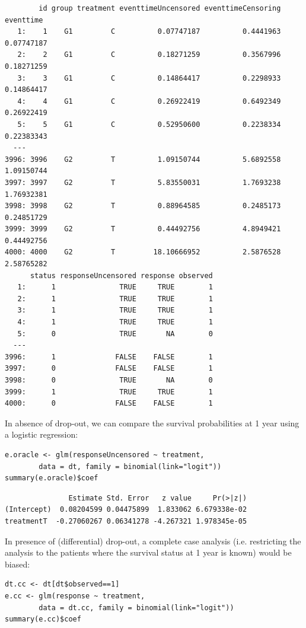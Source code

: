 \documentclass[12pt]{article}
\begin{document}
\begin{verbatim}
        id group treatment eventtimeUncensored eventtimeCensoring  eventtime
   1:    1    G1         C          0.07747187          0.4441963 0.07747187
   2:    2    G1         C          0.18271259          0.3567996 0.18271259
   3:    3    G1         C          0.14864417          0.2298933 0.14864417
   4:    4    G1         C          0.26922419          0.6492349 0.26922419
   5:    5    G1         C          0.52950600          0.2238334 0.22383343
  ---                                                                       
3996: 3996    G2         T          1.09150744          5.6892558 1.09150744
3997: 3997    G2         T          5.83550031          1.7693238 1.76932381
3998: 3998    G2         T          0.88964585          0.2485173 0.24851729
3999: 3999    G2         T          0.44492756          4.8949421 0.44492756
4000: 4000    G2         T         18.10666952          2.5876528 2.58765282
      status responseUncensored response observed
   1:      1               TRUE     TRUE        1
   2:      1               TRUE     TRUE        1
   3:      1               TRUE     TRUE        1
   4:      1               TRUE     TRUE        1
   5:      0               TRUE       NA        0
  ---                                            
3996:      1              FALSE    FALSE        1
3997:      0              FALSE    FALSE        1
3998:      0               TRUE       NA        0
3999:      1               TRUE     TRUE        1
4000:      0              FALSE    FALSE        1
\end{verbatim}

In absence of drop-out, we can compare the survival
probabilities at 1 year using a logistic regression:
\lstset{language=r,label= ,caption= ,captionpos=b,numbers=none}
\begin{lstlisting}
e.oracle <- glm(responseUncensored ~ treatment,
		data = dt, family = binomial(link="logit"))
summary(e.oracle)$coef
\end{lstlisting}

\begin{verbatim}
               Estimate Std. Error   z value     Pr(>|z|)
(Intercept)  0.08204599 0.04475899  1.833062 6.679338e-02
treatmentT  -0.27060267 0.06341278 -4.267321 1.978345e-05
\end{verbatim}


In presence of (differential) drop-out, a complete case analysis
(i.e. restricting the analysis to the patients where the survival
status at 1 year is known) would be biased:
\lstset{language=r,label= ,caption= ,captionpos=b,numbers=none}
\begin{lstlisting}
dt.cc <- dt[dt$observed==1]
e.cc <- glm(response ~ treatment,
	    data = dt.cc, family = binomial(link="logit"))
summary(e.cc)$coef
\end{lstlisting}
\end{document}
